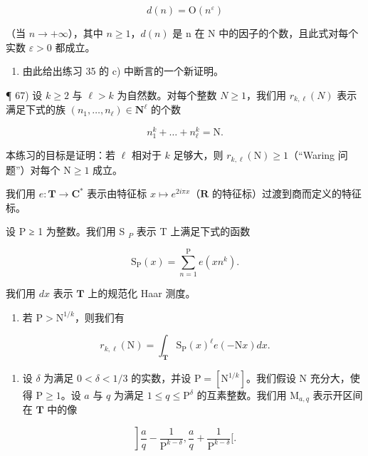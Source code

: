 \[
d (n) = \mathrm{O} (n ^ {\varepsilon})
\]

（当 \(n \to +\infty\)），其中 \(n \geqslant 1\)，\(d(n)\) 是 n 在 N 中的因子的个数，且此式对每个实数 \(\varepsilon > 0\) 都成立。

\begin{enumerate}
\def\labelenumi{\alph{enumi})}
\setcounter{enumi}{2}
\tightlist
\item
  由此给出练习 35 的 c) 中断言的一个新证明。
\end{enumerate}

¶ 67) 设 \(k \geqslant 2\) 与 \(\ell > k\) 为自然数。对每个整数 \(N \geqslant 1\)，我们用 \(r_{k,\ell}(N)\) 表示满足下式的族 \((n_1, \ldots, n_\ell) \in \mathbf{N}^\ell\) 的个数

\[
n _ {1} ^ {k} + \dots + n _ {\ell} ^ {k} = \mathrm{N}.
\]

本练习的目标是证明：若 \(\ell\) 相对于 \(k\) 足够大，则 \(r_{k,\ell}(\mathrm{N}) \geqslant 1\)（“Waring 问题”）对每个 \(\mathrm{N} \geqslant 1\) 成立。

我们用 \(e\colon\mathbf{T}\to\mathbf{C}^{*}\) 表示由特征标 \(x\mapsto e^{2i\pi x}\)（\(\mathbf{R}\) 的特征标）过渡到商而定义的特征标。

设 P ≥ 1 为整数。我们用 S \(_{P}\) 表示 T 上满足下式的函数

\[
\mathrm{S} _ {\mathrm{P}} (x) = \sum_ {n = 1} ^ {\mathrm{P}} e (x n ^ {k}).
\]

我们用 \(dx\) 表示 \(\mathbf{T}\) 上的规范化 Haar 测度。

\begin{enumerate}
\def\labelenumi{\alph{enumi})}
\tightlist
\item
  若 \(\mathrm{P} > \mathrm{N}^{1 / k}\)，则我们有
\end{enumerate}

\[
r _ {k, \ell} (\mathrm{N}) = \int_ {\mathbf {T}} \mathrm{S} _ {\mathrm{P}} (x) ^ {\ell} e (- \mathrm{N} x) d x.
\]

\begin{enumerate}
\def\labelenumi{\alph{enumi})}
\setcounter{enumi}{1}
\tightlist
\item
  设 \(\delta\) 为满足 \(0 < \delta < 1/3\) 的实数，并设 \(\mathrm{P} = [\mathrm{N}^{1/k}]\)。我们假设 N 充分大，使得 \(\mathrm{P} \geqslant 1\)。设 \(a\) 与 \(q\) 为满足 \(1 \leqslant q \leqslant \mathrm{P}^{\delta}\) 的互素整数。我们用 \(\mathrm{M}_{a,q}\) 表示开区间在 \(\mathbf{T}\) 中的像
\end{enumerate}

\[
\left. \right] \frac {a}{q} - \frac {1}{\mathrm{P} ^ {k - \delta}}, \frac {a}{q} + \frac {1}{\mathrm{P} ^ {k - \delta}} \Big [.
\]

